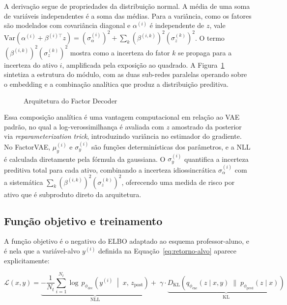 A derivação segue de propriedades da distribuição normal. A média de uma soma de
variáveis independentes é a soma das médias. Para a variância, como os fatores são
modelados com covariância diagonal e $\alpha^{(i)}$ é independente de $z$, vale
$\text{Var}(\alpha^{(i)} + \beta^{(i)\top} z) = (\sigma_\alpha^{(i)})^2 + \sum_k
(\beta^{(i,k)})^2 (\sigma_z^{(k)})^2$. O termo $(\beta^{(i,k)})^2
(\sigma_z^{(k)})^2$ mostra como a incerteza do fator $k$ se propaga para a incerteza
do ativo $i$, amplificada pela exposição ao quadrado. A Figura~\ref{fig:decoder}
sintetiza a estrutura do módulo, com as duas sub-redes paralelas operando sobre o
embedding e a combinação analítica que produz a distribuição preditiva.

\begin{figure}[ht]
    \centering
    
    \caption{Arquitetura do Factor Decoder}
    \label{fig:decoder}
\end{figure}

Essa composição analítica é uma vantagem computacional em relação ao VAE padrão, no
qual a log-verossimilhança é avaliada com $z$ amostrado da posterior via
\textit{reparameterization trick}, introduzindo variância no estimador do gradiente.
No FactorVAE, $\mu_y^{(i)}$ e $\sigma_y^{(i)}$ são funções determinísticas dos
parâmetros, e a NLL é calculada diretamente pela fórmula da gaussiana. O
$\sigma_y^{(i)}$ quantifica a incerteza preditiva total para cada ativo, combinando a
incerteza idiossincrática $\sigma_\alpha^{(i)}$ com a sistemática $\sum_k
(\beta^{(i,k)})^2 (\sigma_z^{(k)})^2$, oferecendo uma medida de risco por ativo que é
subproduto direto da arquitetura.


\subsection{Função objetivo e treinamento}
\label{subsec:funcao-objetivo}

A função objetivo é o negativo do ELBO adaptado ao esquema professor-aluno, e é nela
que a variável-alvo $y^{(i)}$ definida na Equação~\ref{eq:retorno-alvo} aparece
explicitamente:

\begin{equation}
    \mathcal{L}(x, y) = \underbrace{-\frac{1}{N_t}\sum_{i=1}^{N_t} \log \,
    p_{\phi_{\text{dec}}}\!\left(y^{(i)} \;\middle|\; x,\, z_{\text{post}}
    \right)}_{\text{NLL}} + \;\gamma \cdot \underbrace{D_{\text{KL}}\!\left(
    q_{\phi_{\text{enc}}}(z \mid x, y) \;\|\; p_{\phi_{\text{pred}}}(z \mid x)
    \right)}_{\text{KL}}
    \label{eq:loss}
\end{equation}

